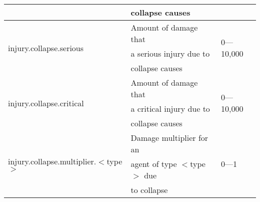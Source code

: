 \documentclass{article}
\begin{document}
\begin{table}[htb]
\begin{tabular}{lll}
                                                                & collapse
  causes                                & \\
  \hline
  \multirow{3}{*}{injury.collapse.serious}                      & Amount of
  damage that                           & \multirow{3}{*}{0---10,000}\\
                                                                & a serious
  injury due to                         & \\
                                                                & collapse
  causes                                & \\
  \hline
  \multirow{3}{*}{injury.collapse.critical}                     & Amount of
  damage that                           & \multirow{3}{*}{0---10,000}\\
                                                                & a critical
  injury due to                         & \\
                                                                & collapse
  causes & \\
  \hline
  \multirow{3}{*}{injury.collapse.multiplier.$<$type$>$}        & Damage
  multiplier for an                     & \multirow{3}{*}{0---1}\\
                                                                & agent of type
  $<$type$>$ due                        & \\
                                                                & to collapse
                                        & \\
  \hline
\end{tabular}
\end{table}
\end{document}
